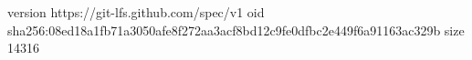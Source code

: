 version https://git-lfs.github.com/spec/v1
oid sha256:08ed18a1fb71a3050afe8f272aa3acf8bd12c9fe0dfbc2e449f6a91163ac329b
size 14316
